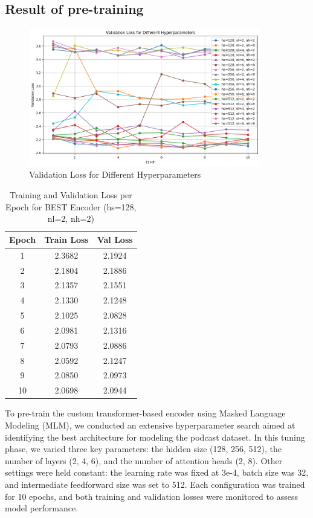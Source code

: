 \documentclass[11pt,letterpaper]{article}
\begin{document}
\vspace{1em} %
\subsection{Result of pre-training}
\vspace{0.5em} %

\begin{figure}[H]
    \centering
    \includegraphics[width=0.9\textwidth]{figs/val_loss_graph.png}
    \caption{Validation Loss for Different Hyperparameters}
    \label{fig:prob_hist_glove}
\end{figure}

\begin{table}[h!]
\centering
\begin{tabular}{|c|c|c|}
\hline
\textbf{Epoch} & \textbf{Train Loss} & \textbf{Val Loss} \\
\hline
1  & 2.3682 & 2.1924 \\
2  & 2.1804 & 2.1886 \\
3  & 2.1357 & 2.1551 \\
4  & 2.1330 & 2.1248 \\
5  & 2.1025 & 2.0828 \\
6  & 2.0981 & 2.1316 \\
7  & 2.0793 & 2.0886 \\
8  & 2.0592 & 2.1247 \\
9  & 2.0850 & 2.0973 \\
10 & 2.0698 & 2.0944 \\
\hline
\end{tabular}
\caption{Training and Validation Loss per Epoch for BEST Encoder (hs=128, nl=2, nh=2)}
\label{tab:best_encoder_loss}
\end{table}

To pre-train the custom transformer-based encoder using Masked Language Modeling (MLM), we conducted an extensive hyperparameter search aimed at identifying the best architecture for modeling the podcast dataset. In this tuning phase, we varied three key parameters: the hidden size (128, 256, 512), the number of layers (2, 4, 6), and the number of attention heads (2, 8). Other settings were held constant: the learning rate was fixed at 3e-4, batch size was 32, and intermediate feedforward size was set to 512. Each configuration was trained for 10 epochs, and both training and validation losses were monitored to assess model performance.
\end{document}
